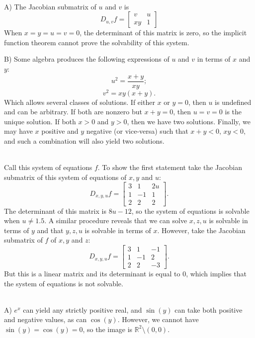 \documentclass[12pt,leqno]{article}
\begin{document}
\bigskip
{}\\
\indent A) The Jacobian submatrix of $u$ and $v$ is 
$$D_{u,v}f = \begin{bmatrix}
	v & u \\
	xy & 1
\end{bmatrix}$$
When $x = y = u = v = 0$, the determinant of this matrix is zero, so the implicit function theorem cannot prove the solvability of this system.

\indent B) Some algebra produces the following expressions of $u$ and $v$ in terms of $x$ and $y$:
$$u^2 = \frac{x + y}{xy};$$
$$v^2 = xy(x+y).$$
Which allows several classes of solutions. If either $x$ or $y=0$, then $u$ is undefined and can be arbitrary. If both are nonzero but $x+y = 0$, then $u=v=0$ is the unique solution. If both $x>0$ and $y>0$, then we have two solutions. Finally, we may have $x$ positive and $y$ negative (or vice-versa) such that $x+y<0$, $xy<0$, and such a combination will also yield two solutions.

\bigskip
{}\\
\indent Call this system of equations $f$. To show the first statement take the Jacobian submatrix of this system of equations of $x, y$ and $u$:
$$D_{x,y,u}f = \begin{bmatrix}
	3 & 1 & 2u \\
	1 & -1 & 1 \\
	2 & 2 & 2
\end{bmatrix}.$$
The determinant of this matrix is $8u-12$, so the system of equations is solvable when $u \neq 1.5$. A similar procedure reveals that we can solve $x, z, u$ is solvable in terms of $y$ and that $y, z, u$ is solvable in terms of $x$. However, take the Jacobian submatrix of $f$ of $x, y$ and $z$:
$$D_{x,y,u}f = \begin{bmatrix}
	3 & 1 & -1 \\
	1 & -1 & 2 \\
	2 & 2 & -3
\end{bmatrix}.$$
But this is a linear matrix and its determinant is equal to 0, which implies that the system of equations is not solvable. 


\bigskip
{}\\
\indent A) $e^x$ can yield any strictly positive real, and $\sin(y)$ can take both positive and negative values, as can $\cos(y)$. However, we cannot have $\sin(y) = \cos(y) = 0$, so the image is $\mathds{R}^2 \setminus (0, 0).$
\end{document}
